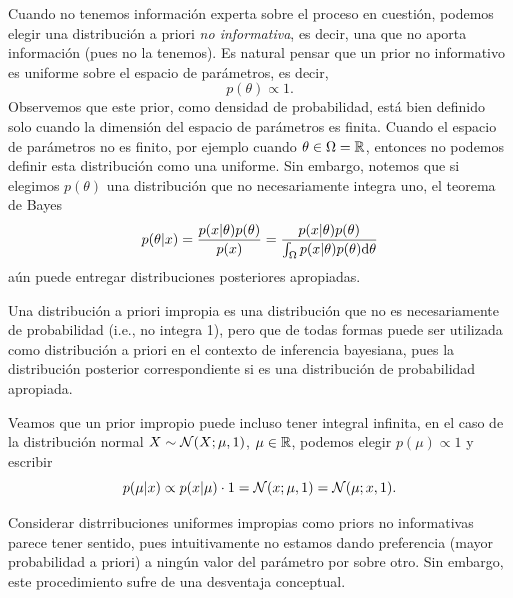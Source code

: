 Cuando no tenemos información experta sobre el proceso en cuestión, podemos elegir una distribución a priori \textit{no informativa}, es decir, una que no aporta información (pues no la tenemos). Es natural pensar que un prior no informativo es uniforme sobre el espacio de parámetros, es decir, 
\begin{equation}
	p(\theta)\propto 1.
\end{equation}
Observemos que este prior, como densidad de probabilidad, está bien definido solo cuando la dimensión del espacio de parámetros es finita. Cuando el espacio de parámetros no es finito, por ejemplo cuando $\theta\in\Omega={\mathbb R}$, entonces no podemos definir esta distribución como una uniforme. Sin embargo, notemos que si elegimos $p(\theta)$ una distribución que no necesariamente integra uno, el teorema de Bayes
\begin{equation}
	p(\theta|x) = \frac{p(x|\theta)p(\theta)}{p(x)} = \frac{p(x|\theta)p(\theta)}{\int_\Omega p(x|\theta)p(\theta){\text{d}}\theta}
\end{equation}
aún puede entregar distribuciones posteriores apropiadas. 

\begin{definition} Una distribución a priori impropia es una distribución que no es necesariamente de probabilidad (i.e., no integra 1), pero que de todas formas puede ser utilizada como distribución a priori en el contexto de inferencia bayesiana, pues la distribución posterior correspondiente si es una distribución de probabilidad apropiada. 
\end{definition}

\begin{remark} Veamos que un prior impropio puede incluso tener integral infinita, en el caso de la distribución normal $X\sim{\mathcal N}(X;\mu,1)$,  $\mu\in{\mathbb R}$, podemos elegir $p(\mu)\propto1$ y escribir 
\begin{equation}
	p(\mu|x)\propto p(x|\mu)\cdot 1 = {\mathcal N}(x;\mu,1) = {\mathcal N}(\mu;x,1). 
\end{equation}
	
\end{remark}

Considerar distrribuciones uniformes impropias como priors no informativas parece tener sentido, pues intuitivamente no estamos dando preferencia (mayor probabilidad a priori) a ningún valor del parámetro por sobre otro. Sin embargo, este procedimiento sufre de una desventaja conceptual.

